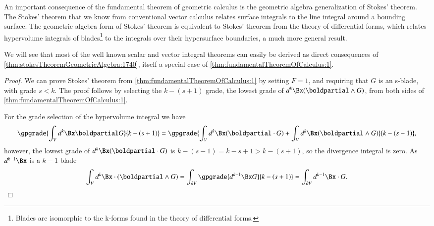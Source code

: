%
%
An important consequence of the fundamental theorem of geometric calculus is the
geometric algebra generalization of Stokes' theorem.
The Stokes' theorem that we know from conventional vector calculus relates
 surface integrals to the line integral around a bounding surface.
The geometric algebra form of Stokes' theorem is equivalent to Stokes' theorem from the theory of differential forms, which relates
hypervolume integrals of blades\footnote{Blades are isomorphic to the k-forms found in the theory of differential forms.} to the integrals over their hypersurface boundaries, a much more general result.



We will see that most of the well known scalar and vector integral theorems can easily be derived as direct consequences of \cref{thm:stokesTheoremGeometricAlgebra:1740}, itself a special case of \cref{thm:fundamentalTheoremOfCalculus:1}.

\begin{proof}
We can prove Stokes' theorem
from \cref{thm:fundamentalTheoremOfCalculus:1}
by setting \( F = 1 \), and requiring that \( G \)
is an s-blade, with grade \( s < k \).
The proof follows by selecting the \( k-(s+1) \) grade, the lowest grade of \( d^k \Bx (\boldpartial \wedge G) \), from both sides of \cref{thm:fundamentalTheoremOfCalculus:1}.

For the grade selection of the hypervolume integral we have
\begin{dmath}\label{eqn:stokesTheoremTheStatement:100}
\gpgrade{ \int_V d^k \Bx \boldpartial G }{k-(s+1)}
=
\gpgrade{
\int_V d^k \Bx (\boldpartial \cdot G )
+
\int_V d^k \Bx (\boldpartial \wedge G )
}{k-(s-1)},
\end{dmath}
however, the lowest grade of \( d^k \Bx (\boldpartial \cdot G ) \) is \( k -(s-1) = k - s + 1 > k - (s+1) \), so the divergence integral is zero.  As \( d^{k-1} \Bx \) is a \( k - 1 \) blade
\begin{dmath}\label{eqn:stokesTheoremTheStatement:110}
\int_V d^k \Bx \cdot (\boldpartial \wedge G )
= \int_{\partial V} \gpgrade{d^{k-1} \Bx G}{k-(s+1)}
= \int_{\partial V} d^{k-1} \Bx \cdot G.
\end{dmath}
\end{proof}
